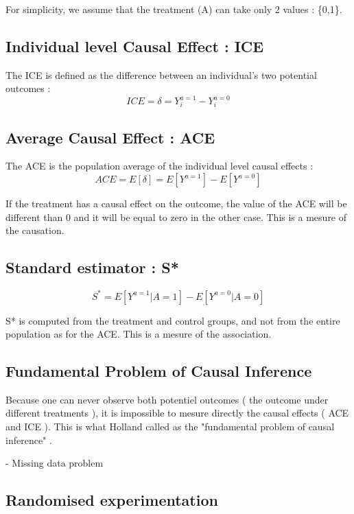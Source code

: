 \documentclass{article}
\begin{document}
For simplicity, we assume that the treatment (A) can take only 2 values : \{0,1\}.


\subsection{Individual level Causal Effect : ICE}
The ICE is defined as the difference between an individual’s two potential outcomes :
$$ ICE = \delta = Y_{i}^{a=1} - Y_{i}^{a=0} $$



\subsection{Average Causal Effect : ACE}
The ACE is the population average of the individual level causal effects :
$$ ACE = E[\delta] = E[Y^{a=1}] - E[Y^{a=0}] $$

If the treatment has a causal effect on the outcome, the value of the ACE will be different than 0 and it will be equal to zero in the other case. This is a mesure of the causation.
\subsection{Standard estimator : S*}

$$ S^{*} = E[Y^{a=1}|A=1] - E[Y^{a=0}|A=0] $$

S* is computed from the treatment and control groups, and not from the entire population as for the ACE. This is a mesure of the association.


\subsection{Fundamental Problem of Causal Inference}

Because one can never observe both potentiel outcomes ( the outcome under different treatments ), it is impossible to mesure directly the causal effects ( ACE and ICE ). This is what Holland called as the "fundamental problem of causal inference" \cite{holland1986statistics}.

- Missing data problem 


\subsection{Randomised experimentation}
\end{document}
